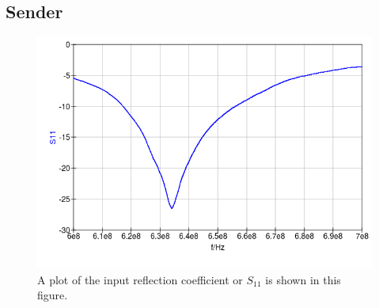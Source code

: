 \documentclass[conference]{IEEEtran}
\begin{document}
\subsection{Sender}
\begin{figure}[h]
\centering
\includegraphics[width=0.6\columnwidth]{./fig/s11}
\caption{A plot of the input reflection coefficient or \ensuremath{S_{\text{11}}} is shown in this figure.}
\label{fig:s11}
\end{figure}
\end{document}
